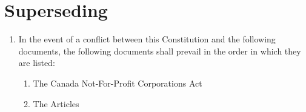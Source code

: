 \section{Superseding}
\label{superseding}

\begin{enumerate}
 \item In the event of a conflict between this Constitution and the following documents, the following documents shall prevail in the order in which they are listed:
  \begin{enumerate}
   \item The Canada Not-For-Profit Corporations Act
   \item The Articles
  \end{enumerate}
\end{enumerate}
